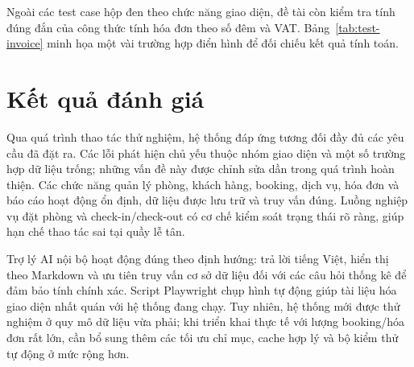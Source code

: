\documentclass[13pt,a4paper]{extreport}
\begin{document}
Ngoài các test case hộp đen theo chức năng giao diện, đề tài còn kiểm tra tính đúng đắn của công thức tính hóa đơn theo số đêm và VAT. Bảng~\ref{tab:test-invoice} minh họa một vài trường hợp điển hình để đối chiếu kết quả tính toán.

\begin{table}[H]
\centering
\caption{Bảng kiểm thử công thức tính hóa đơn}
\label{tab:test-invoice}
%
\end{table}

\section{Kết quả đánh giá}

Qua quá trình thao tác thử nghiệm, hệ thống đáp ứng tương đối đầy đủ các yêu cầu đã đặt ra. Các lỗi phát hiện chủ yếu thuộc nhóm giao diện và một số trường hợp dữ liệu trống; những vấn đề này được chỉnh sửa dần trong quá trình hoàn thiện. Các chức năng quản lý phòng, khách hàng, booking, dịch vụ, hóa đơn và báo cáo hoạt động ổn định, dữ liệu được lưu trữ và truy vấn đúng. Luồng nghiệp vụ đặt phòng và check-in/check-out có cơ chế kiểm soát trạng thái rõ ràng, giúp hạn chế thao tác sai tại quầy lễ tân.

Trợ lý AI nội bộ hoạt động đúng theo định hướng: trả lời tiếng Việt, hiển thị theo Markdown và ưu tiên truy vấn cơ sở dữ liệu đối với các câu hỏi thống kê để đảm bảo tính chính xác. Script Playwright chụp hình tự động giúp tài liệu hóa giao diện nhất quán với hệ thống đang chạy. Tuy nhiên, hệ thống mới được thử nghiệm ở quy mô dữ liệu vừa phải; khi triển khai thực tế với lượng booking/hóa đơn rất lớn, cần bổ sung thêm các tối ưu chỉ mục, cache hợp lý và bộ kiểm thử tự động ở mức rộng hơn.
\end{document}
